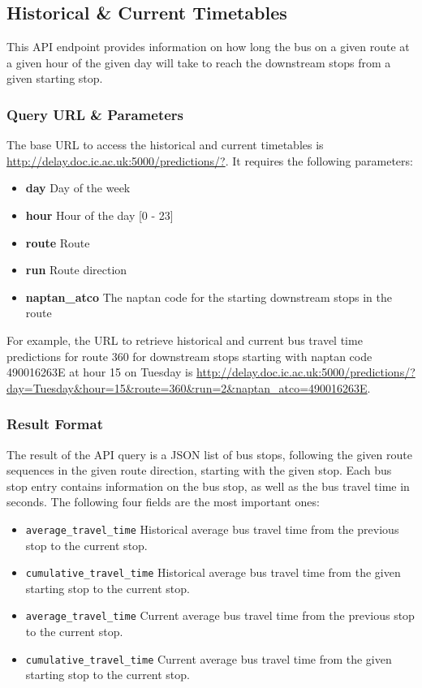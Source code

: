 
\subsection{Historical \& Current Timetables}
\par This API endpoint provides information on how long the bus on a given route at a given hour of the given day will take to reach the downstream stops from a given starting stop.

\subsubsection{Query URL \& Parameters}
\label{sec:predictions_params}
\par The base URL to access the historical and current timetables is \url{http://delay.doc.ic.ac.uk:5000/predictions/?}. It requires the following parameters:
\begin{itemize}
  \item \textbf{day} Day of the week
  \item \textbf{hour} Hour of the day [0 - 23]
  \item \textbf{route} Route
  \item \textbf{run} Route direction
  \item \textbf{naptan\_atco} The \gls{naptan} code for the starting downstream stops in the route
\end{itemize}

\par For example, the URL to retrieve historical and current bus travel time predictions for route 360 for downstream stops starting with \gls{naptan} code 490016263E at hour 15 on Tuesday is \url{http://delay.doc.ic.ac.uk:5000/predictions/?day=Tuesday&hour=15&route=360&run=2&naptan_atco=490016263E}.

\subsubsection{Result Format}
\par The result of the API query is a JSON list of bus stops, following the given route sequences in the given route direction, starting with the given stop. Each bus stop entry contains information on the bus stop, as well as the bus travel time in seconds. The following four fields are the most important ones:

\begin{itemize}
  \item \texttt{average\_travel\_time} Historical average bus travel time from the previous stop to the current stop.
  \item \texttt{cumulative\_travel\_time} Historical average bus travel time from the given starting stop to the current stop.
  \item \texttt{average\_travel\_time} Current average bus travel time from the previous stop to the current stop.
  \item \texttt{cumulative\_travel\_time} Current average bus travel time from the given starting stop to the current stop.
\end{itemize}

